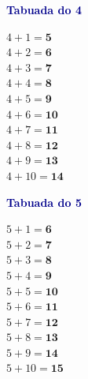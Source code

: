 \documentclass[12pt]{article}
\begin{document}
\begin{minipage}[t]{3.3cm}
\noindent\textcolor{darkblue}{\bfseries\small Tabuada do 4}\par\vspace{2pt}
{\footnotesize
$4{+}1=\mathbf{5}$\\$4{+}2=\mathbf{6}$\\$4{+}3=\mathbf{7}$\\
$4{+}4=\mathbf{8}$\\$4{+}5=\mathbf{9}$\\$4{+}6=\mathbf{10}$\\
$4{+}7=\mathbf{11}$\\$4{+}8=\mathbf{12}$\\$4{+}9=\mathbf{13}$\\
$4{+}10=\mathbf{14}$}
\end{minipage}\hfill
\begin{minipage}[t]{3.3cm}
\noindent\textcolor{darkblue}{\bfseries\small Tabuada do 5}\par\vspace{2pt}
{\footnotesize
$5{+}1=\mathbf{6}$\\$5{+}2=\mathbf{7}$\\$5{+}3=\mathbf{8}$\\
$5{+}4=\mathbf{9}$\\$5{+}5=\mathbf{10}$\\$5{+}6=\mathbf{11}$\\
$5{+}7=\mathbf{12}$\\$5{+}8=\mathbf{13}$\\$5{+}9=\mathbf{14}$\\
$5{+}10=\mathbf{15}$}
\end{minipage}
\end{document}
